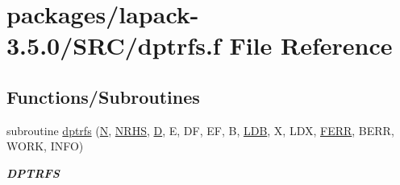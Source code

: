 \hypertarget{dptrfs_8f}{}\section{packages/lapack-\/3.5.0/\+S\+R\+C/dptrfs.f File Reference}
\label{dptrfs_8f}
\subsection*{Functions/\+Subroutines}
\begin{DoxyCompactItemize}
\item 
subroutine \hyperlink{group__doublePTcomputational_ga04d5010035410aca1d81e9ee1587fd17}{dptrfs} (\hyperlink{polmisc_8c_a0240ac851181b84ac374872dc5434ee4}{N}, \hyperlink{example__user_8c_aa0138da002ce2a90360df2f521eb3198}{N\+R\+H\+S}, \hyperlink{odrpack_8h_a7dae6ea403d00f3687f24a874e67d139}{D}, E, D\+F, E\+F, B, \hyperlink{example__user_8c_a50e90a7104df172b5a89a06c47fcca04}{L\+D\+B}, X, L\+D\+X, \hyperlink{superlu__enum__consts_8h_af00a42ecad444bbda75cde1b64bd7e72a78fd14d7abebae04095cfbe02928f153}{F\+E\+R\+R}, B\+E\+R\+R, W\+O\+R\+K, I\+N\+F\+O)
\begin{DoxyCompactList}\small\item\em {\bfseries D\+P\+T\+R\+F\+S} \end{DoxyCompactList}\end{DoxyCompactItemize}
